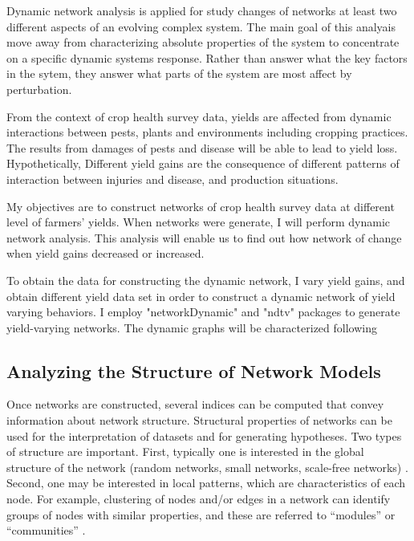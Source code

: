 Dynamic network analysis is applied for study changes of networks at least two different aspects of an evolving complex system. The main goal of this analyais move away from characterizing absolute properties of the system to concentrate on a specific dynamic systems response. Rather than answer what the key factors in the sytem, they answer what parts of the system are most affect by perturbation.

From the context of crop health survey data, yields are affected from dynamic interactions between pests, plants and environments including cropping practices. The results from damages of pests and disease will be able to lead to yield loss. Hypothetically, Different yield gains are the consequence of different patterns of interaction between injuries and disease, and production situations.

My objectives are to construct networks of crop health survey data at different level of farmers' yields. When networks were generate, I will perform dynamic network analysis. This analysis will enable us to find out how network of change when yield gains decreased or increased.


To obtain the data for constructing the dynamic network, I vary yield gains, and obtain different yield data set in order to construct a dynamic network of yield varying behaviors. I employ "networkDynamic"  and "ndtv"  packages to generate yield-varying networks. The dynamic graphs will be characterized following 



\subsection*{Analyzing the Structure of Network Models}

Once networks are constructed, several indices can be computed that convey information about network structure. Structural properties of networks can be used for the interpretation of datasets and for generating hypotheses. Two types of structure are important. First, typically one is interested in the global structure of the network (random networks, small networks, scale-free networks) . Second, one may be interested in local patterns, which are characteristics of each node. For example, clustering of nodes and/or edges in a network can identify groups of nodes with similar properties, and these are referred to ``modules'' or ``communities''  .

